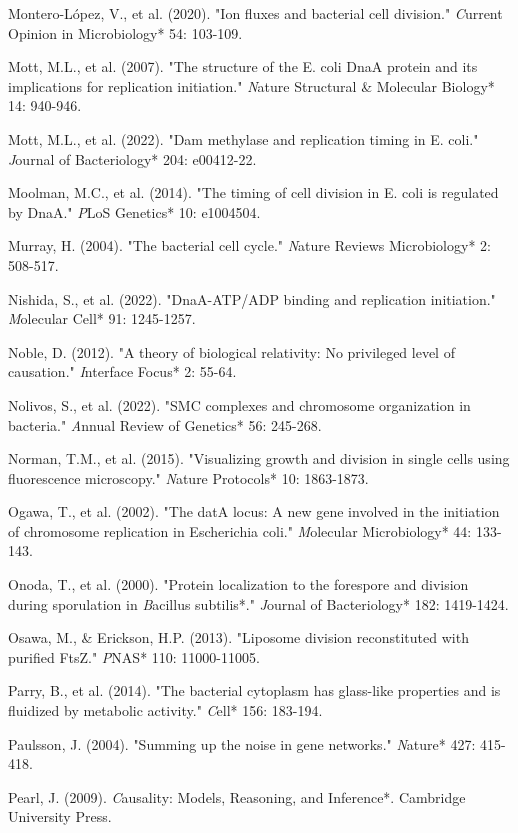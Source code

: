 \documentclass[11pt,a4paper]{article}
\begin{document}
Montero-López, V., et al. (2020). "Ion fluxes and bacterial cell division." \textit*Current Opinion in Microbiology* 54: 103-109.

Mott, M.L., et al. (2007). "The structure of the E. coli DnaA protein and its implications for replication initiation." \textit*Nature Structural & Molecular Biology* 14: 940-946.

Mott, M.L., et al. (2022). "Dam methylase and replication timing in E. coli." \textit*Journal of Bacteriology* 204: e00412-22.

Moolman, M.C., et al. (2014). "The timing of cell division in E. coli is regulated by DnaA." \textit*PLoS Genetics* 10: e1004504.

Murray, H. (2004). "The bacterial cell cycle." \textit*Nature Reviews Microbiology* 2: 508-517.

Nishida, S., et al. (2022). "DnaA-ATP/ADP binding and replication initiation." \textit*Molecular Cell* 91: 1245-1257.

Noble, D. (2012). "A theory of biological relativity: No privileged level of causation." \textit*Interface Focus* 2: 55-64.

Nolivos, S., et al. (2022). "SMC complexes and chromosome organization in bacteria." \textit*Annual Review of Genetics* 56: 245-268.

Norman, T.M., et al. (2015). "Visualizing growth and division in single cells using fluorescence microscopy." \textit*Nature Protocols* 10: 1863-1873.

Ogawa, T., et al. (2002). "The datA locus: A new gene involved in the initiation of chromosome replication in Escherichia coli." \textit*Molecular Microbiology* 44: 133-143.

Onoda, T., et al. (2000). "Protein localization to the forespore and division during sporulation in \textit*Bacillus subtilis*." \textit*Journal of Bacteriology* 182: 1419-1424.

Osawa, M., & Erickson, H.P. (2013). "Liposome division reconstituted with purified FtsZ." \textit*PNAS* 110: 11000-11005.

Parry, B., et al. (2014). "The bacterial cytoplasm has glass-like properties and is fluidized by metabolic activity." \textit*Cell* 156: 183-194.

Paulsson, J. (2004). "Summing up the noise in gene networks." \textit*Nature* 427: 415-418.

Pearl, J. (2009). \textit*Causality: Models, Reasoning, and Inference*. Cambridge University Press.
\end{document}
